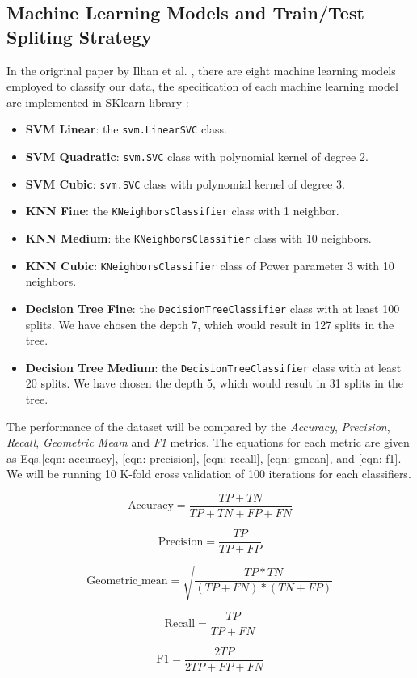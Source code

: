 \subsection{Machine Learning Models and Train/Test Spliting Strategy}
In the origrinal paper by Ilhan et al. \cite{kilincer2021machine}, there are eight machine learning models employed to classify our data, the specification of each machine learning model are implemented in SKlearn library \cite{johnson2018fault}:
\begin{itemize}
    \item \textbf{SVM Linear}: the \texttt{svm.LinearSVC} class.
    \item \textbf{SVM Quadratic}: \texttt{svm.SVC} class with polynomial kernel of degree 2.
    \item \textbf{SVM Cubic}: \texttt{svm.SVC} class with polynomial kernel of degree 3.
    \item \textbf{KNN Fine}: the \texttt{KNeighborsClassifier} class with 1 neighbor.
    \item \textbf{KNN Medium}: the \texttt{KNeighborsClassifier} class with 10 neighbors.
    \item \textbf{KNN Cubic}: \texttt{KNeighborsClassifier} class of Power parameter 3 with 10 neighbors.
    \item \textbf{Decision Tree Fine}: the \texttt{DecisionTreeClassifier} class with at least 100 splits. We have chosen the depth 7, which would result in 127 splits in the tree.
    \item \textbf{Decision Tree Medium}: the \texttt{DecisionTreeClassifier} class with at least 20 splits. We have chosen the depth 5, which would result in 31 splits in the tree.
\end{itemize}


The performance of the dataset will be compared by the \emph{Accuracy}, \emph{Precision}, \emph{Recall}, \emph{Geometric Meam} and \emph{F1} metrics.
The equations for each metric are given as Eqs.\ref{eqn: accuracy}, \ref{eqn: precision}, \ref{eqn: recall}, \ref{eqn: gmean}, and \ref{eqn: f1}.
We will be running 10 K-fold cross validation of 100 iterations for each classifiers.

\begin{equation}
    \mbox{Accuracy} = \frac{TP + TN}{TP + TN + FP + FN}
    \label{eqn: accuracy}
\end{equation}

\begin{equation}
    \mbox{Precision} = \frac{TP}{TP+FP}
    \label{eqn: precision}
\end{equation}

\begin{equation}
    \mbox{Geometric\_mean} = \sqrt{ \frac{TP * TN}{(TP+FN)*(TN+FP)}}
    \label{eqn: gmean}
\end{equation}

\begin{equation}
    \mbox{Recall} = \frac{TP}{TP + FN}
    \label{eqn: recall}
\end{equation}

\begin{equation}
    \mbox{F1} = \frac{2TP}{2TP + FP + FN}
    \label{eqn: f1}
\end{equation}

